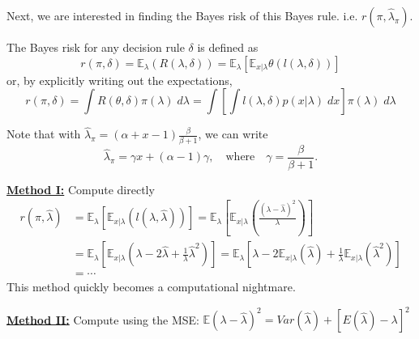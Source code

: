 \documentclass[11pt]{report}
\begin{document}
Next, we are interested in finding the Bayes risk of this Bayes rule. i.e. $r(\pi, \widehat{\lambda}_\pi)$. 
		
The Bayes risk for any decision rule $\delta$ is defined as 
		$$r(\pi, \delta) = \mathbb{E}_\lambda(R(\lambda,\delta)) = \mathbb{E}_\lambda\left[\mathbb{E}_{x|\lambda}\theta\left(l(\lambda, \delta)\right) \right]$$
		or, by explicitly writing out the expectations,
		$$r(\pi, \delta) = \int R(\theta,\delta) \pi(\lambda)\; d\lambda = \int\left[ \int l(\lambda,\delta)p(x|\lambda) \;dx\right] \pi(\lambda)\; d\lambda$$
		

Note that with $\widehat{\lambda}_\pi = (\alpha +x-1)\frac{\beta}{\beta+1}$, we can write	
$$\widehat{\lambda}_\pi = \gamma x + (\alpha-1)\gamma,\quad \text{where} \quad \gamma = \frac{\beta}{\beta+1}.$$


\underline{\textbf{Method I:}} Compute directly \newline
		\begin{align*}
		r\left(\pi, \widehat{\lambda}\right)
		&  = \mathbb{E}_\lambda\left[\mathbb{E}_{x|\lambda}\left(l(\lambda, \widehat{\lambda})\right) \right] 
		   = \mathbb{E}_\lambda\left[\mathbb{E}_{x|\lambda}\left(\frac{(\lambda-\widehat{\lambda})^2}{\lambda}\right) \right] \\
		&  = \mathbb{E}_\lambda\left[\mathbb{E}_{x|\lambda}\left(\lambda - 2\widehat{\lambda} + \frac{1}{\lambda}\widehat{\lambda}^2 \right) \right] 
		   = \mathbb{E}_\lambda\left[\lambda - 2\mathbb{E}_{x|\lambda}\left(\widehat{\lambda}\right) + \frac{1}{\lambda}\mathbb{E}_{x|\lambda}\left(\widehat{\lambda}^2\right)  \right] \\
		& = \cdots
		\end{align*}
This method quickly becomes a computational nightmare. \newline 


\underline{\textbf{Method II:}} Compute using the MSE: $\mathbb{E}(\lambda-\widehat{\lambda})^2 = Var(\widehat{\lambda}) + [E(\widehat{\lambda}) -\lambda]^2$ 
\end{document}
